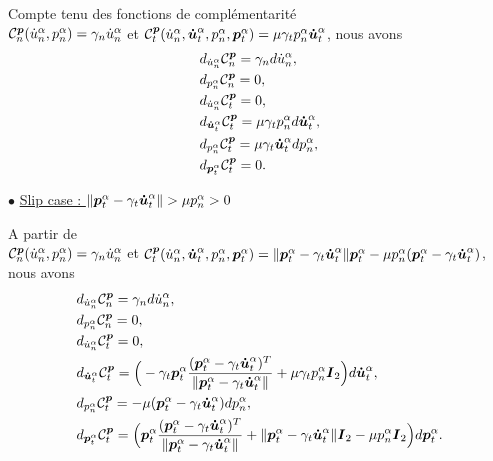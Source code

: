 \noindent Compte tenu des fonctions de complémentarité\\ ${\cal C}_{n}^{\boldsymbol{p}}(\dot{u}^{\alpha}_n,p^{\alpha}_n)=\gamma_n \dot{u}^{\alpha}_n$ et ${\cal C}_{t}^{\boldsymbol{p}}(\dot{u}^{\alpha}_n,\boldsymbol{\dot{u}}^{\alpha}_t,p^{\alpha}_n,\boldsymbol{p}^{\alpha}_t)=\mu \gamma_t p^{\alpha}_n\boldsymbol{\dot{u}}^{\alpha}_t$, nous avons
\begin{align}
&d_{\dot{u}^{\alpha}_n} {\cal C}_{n}^{\boldsymbol{p}}=\gamma_n d{\dot{u}^{\alpha}_n}\label{phi11st_gran},\\
&d_{p^{\alpha}_n} {\cal C}_{n}^{\boldsymbol{p}}=0\label{phi12st_gran},\\
&d_{\dot{u}^{\alpha}_n} {\cal C}_{t}^{\boldsymbol{p}}=0,\label{phi21st_gran}\\
&d_{\boldsymbol{\dot{u}}^{\alpha}_t} {\cal C}_{t}^{\boldsymbol{p}}=\mu \gamma_t p^{\alpha}_n d{\boldsymbol{\dot{u}}^{\alpha}_t},\label{phi22st_gran}\\
&d_{p^{\alpha}_n} {\cal C}_{t}^{\boldsymbol{p}}=\mu \gamma_t \boldsymbol{\dot{u}}^{\alpha}_t d{p^{\alpha}_n},\label{phi23st_gran}\\
&d_{\boldsymbol{p}^{\alpha}_t} {\cal C}_{t}^{\boldsymbol{p}}=0\label{phi24st_gran}.
\end{align}

$\bullet$ \underline{Slip case : $\|\vect{p}^{\alpha}_t - \gamma_t \vect{\dot{u}}^{\alpha}_t\|> \mu p^{\alpha}_n> 0$}

\noindent A partir de\\ ${\cal C}_{n}^{\boldsymbol{p}}(\dot{u}^{\alpha}_n,p^{\alpha}_n)=\gamma_n \dot{u}^{\alpha}_n$ et ${\cal C}_{t}^{\boldsymbol{p}}(\dot{u}^{\alpha}_n,\boldsymbol{\dot{u}}^{\alpha}_t,p^{\alpha}_n,\boldsymbol{p}^{\alpha}_t)=\|\boldsymbol{p}^{\alpha}_t - \gamma_t \boldsymbol{\dot{u}}^{\alpha}_t\|\boldsymbol{p}^{\alpha}_t- \mu p^{\alpha}_n (\boldsymbol{p}^{\alpha}_t - \gamma_t \boldsymbol{\dot{u}}^{\alpha}_t)$, nous avons \begin{align}
&d_{\dot{u}^{\alpha}_n} {\cal C}_{n}^{\boldsymbol{p}}=\gamma_n d{\dot{u}^{\alpha}_n}\label{phi11sl_gran},\\
&d_{p^{\alpha}_n} {\cal C}_{n}^{\boldsymbol{p}}=0\label{phi12sl_gran},\\
&d_{\dot{u}^{\alpha}_n} {\cal C}_{t}^{\boldsymbol{p}}=0,\label{phi21sl_gran}\\
&d_{\boldsymbol{\dot{u}}^{\alpha}_t} {\cal C}_{t}^{\boldsymbol{p}}=\Big(- \gamma_t \boldsymbol{p}^{\alpha}_t\frac{(\boldsymbol{p}^{\alpha}_t - \gamma_t \boldsymbol{\dot{u}}^{\alpha}_t)^T}{\|\boldsymbol{p}^{\alpha}_t - \gamma_t \boldsymbol{\dot{u}}^{\alpha}_t\|}+\mu \gamma_t p^{\alpha}_n\mbox{\boldmath{$I$}}_2\Big)d{\boldsymbol{\dot{u}}^{\alpha}_t},\label{phi22sl_gran}\\
&d_{p^{\alpha}_n} {\cal C}_{t}^{\boldsymbol{p}}=- \mu (\boldsymbol{p}^{\alpha}_t - \gamma_t \boldsymbol{\dot{u}}^{\alpha}_t)dp^{\alpha}_n,\label{phi23sl_gran}\\
&d_{\boldsymbol{p}^{\alpha}_t} {\cal C}_{t}^{\boldsymbol{p}}=\Big( \boldsymbol{p}^{\alpha}_t\frac{(\boldsymbol{p}^{\alpha}_t - \gamma_t \boldsymbol{\dot{u}}^{\alpha}_t)^T}{\|\boldsymbol{p}^{\alpha}_t - \gamma_t \boldsymbol{\dot{u}}^{\alpha}_t\|} +\|\boldsymbol{p}^{\alpha}_t - \gamma_t \boldsymbol{\dot{u}}^{\alpha}_t\|\mbox{\boldmath{$I$}}_2 - \mu p^{\alpha}_n\mbox{\boldmath{$I$}}_2  \Big)d{\boldsymbol{p}^{\alpha}_t}\label{phi24sl_gran}.
\end{align}

